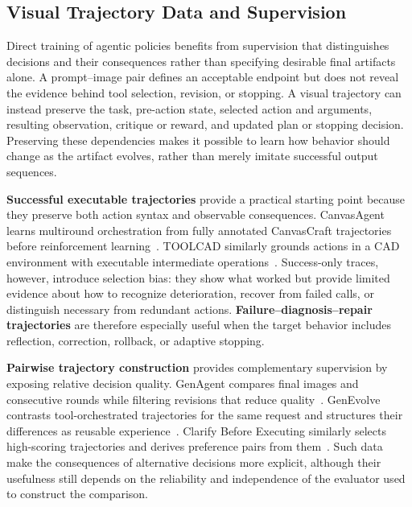 \subsection{Visual Trajectory Data and Supervision}
\label{subsec:trajectory-supervision}

Direct training of agentic policies benefits from supervision that distinguishes decisions and their consequences rather than specifying desirable final artifacts alone. A prompt--image pair defines an acceptable endpoint but does not reveal the evidence behind tool selection, revision, or stopping. A visual trajectory can instead preserve the task, pre-action state, selected action and arguments, resulting observation, critique or reward, and updated plan or stopping decision. Preserving these dependencies makes it possible to learn how behavior should change as the artifact evolves, rather than merely imitate successful output sequences.

\textbf{Successful executable trajectories} provide a practical starting point because they preserve both action syntax and observable consequences. CanvasAgent learns multiround orchestration from fully annotated CanvasCraft trajectories before reinforcement learning~\cite{avg260705465}. TOOLCAD similarly grounds actions in a CAD environment with executable intermediate operations~\cite{gong2026toolcad}. Success-only traces, however, introduce selection bias: they show what worked but provide limited evidence about how to recognize deterioration, recover from failed calls, or distinguish necessary from redundant actions. \textbf{Failure--diagnosis--repair trajectories} are therefore especially useful when the target behavior includes reflection, correction, rollback, or adaptive stopping.

\textbf{Pairwise trajectory construction} provides complementary supervision by exposing relative decision quality. GenAgent compares final images and consecutive rounds while filtering revisions that reduce quality~\cite{jiang2026genagent}. GenEvolve contrasts tool-orchestrated trajectories for the same request and structures their differences as reusable experience~\cite{chen2026genevolve}. Clarify Before Executing similarly selects high-scoring trajectories and derives preference pairs from them~\cite{avg260716352}. Such data make the consequences of alternative decisions more explicit, although their usefulness still depends on the reliability and independence of the evaluator used to construct the comparison.

